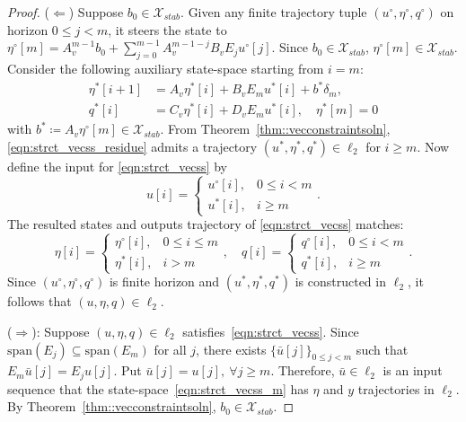 \begin{proof}
($\Leftarrow$) Suppose \(b_0 \in \mathcal{X}_{stab} \).
Given any finite trajectory tuple \((u^\circ, \eta^\circ, q^\circ)\) on horizon \( 0\leq j <m\), it steers the state to \(\eta^\circ[m] = A_v^{m-1} b_0+ \sum_{j=0}^{m-1} A_v^{m-1-j} B_v E_j u^\circ[j]\).
Since \(b_0 \in \mathcal{X}_{stab}\), \(\eta^\circ[m] \in \mathcal{X}_{stab}\).
Consider the following auxiliary state-space starting from \(i = m\):
\begin{subequations}\label{eqn:strct_vecss_residue}
\begin{align}
    \eta^*[i+1] &= A_v \eta^*[i] + B_v E_m u^*[i] + b^* \delta_m,\\
    q^*[i] &= C_v \eta^*[i] + D_v E_m u^*[i], \quad \eta^*[m]=0   
\end{align}  
\end{subequations}
with \(b^* \coloneqq A_v \eta^\circ[m]\in \mathcal{X}_{stab}\). From Theorem~\ref{thm::vecconstraintsoln}, \eqref{eqn:strct_vecss_residue} admits a trajectory
$(u^*,\eta^*,q^*)\in \ell_2$ for $i\geq m$.
Now define the input for \eqref{eqn:strct_vecss} by
\[
u[i] = 
\begin{cases}
u^\circ[i], & 0\leq i<m\\
u^*[i], & i\geq m
\end{cases}.
\]
The resulted states and outputs trajectory of \eqref{eqn:strct_vecss} matches:
\[
\eta[i] = \begin{cases}
\eta^\circ[i], & 0\leq i \leq m\\
\eta^*[i], & i > m
\end{cases},
\quad q[i] = \begin{cases}
q^\circ[i], & 0\leq i<m\\
q^*[i], & i\geq m
\end{cases}.
\]
Since $(u^\circ,\eta^\circ,q^\circ)$ is finite horizon and $(u^*,\eta^*,q^*)$ is constructed in $\ell_2$, it follows that $(u,\eta,q)\in \ell_2$.  

($\Rightarrow$): Suppose \((u,\eta,q)\in\ell_2\) satisfies~\eqref{eqn:strct_vecss}. Since $\mathrm{span}(E_j)\subseteq \mathrm{span}(E_m)$ for all $j$, there exists \(\{\bar{u}[j]\}_{0\leq j< m}\) such that \(E_m \bar{u}[j] = E_j u[j]\). Put \(\bar{u}[j] = u[j],\ \forall j \geq m\). Therefore, \(\bar{u} \in \ell_2\) is an input sequence that the state-space~\eqref{eqn:strct_vecss_m} has \(\eta\) and \(y\) trajectories in \(\ell_2\). By Theorem~\ref{thm::vecconstraintsoln}, \(b_0\in \mathcal{X}_{stab}\).
\end{proof}
